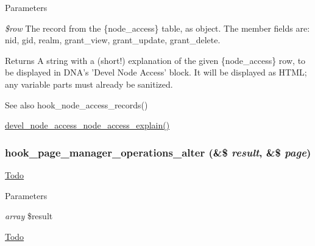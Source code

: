 \begin{DoxyParams}{Parameters}
\item[{\em \$row}]The record from the \{node\_\-access\} table, as object. The member fields are: nid, gid, realm, grant\_\-view, grant\_\-update, grant\_\-delete.\end{DoxyParams}
\begin{DoxyReturn}{Returns}
A string with a (short!) explanation of the given \{node\_\-access\} row, to be displayed in DNA's 'Devel Node Access' block. It will be displayed as HTML; any variable parts must already be sanitized.
\end{DoxyReturn}
\begin{DoxySeeAlso}{See also}
hook\_\-node\_\-access\_\-records() 

\hyperlink{devel__node__access_8module_a7b594d5b01b220abc354695853569809}{devel\_\-node\_\-access\_\-node\_\-access\_\-explain()} 
\end{DoxySeeAlso}
\hypertarget{group__hooks_gadade57abdccc892f62ed6bc7f089ca29}{
\subsubsection[{hook\_\-page\_\-manager\_\-operations\_\-alter}]{\setlength{\rightskip}{0pt plus 5cm}hook\_\-page\_\-manager\_\-operations\_\-alter (\&\$ {\em result}, \/  \&\$ {\em page})}}
\label{group__hooks_gadade57abdccc892f62ed6bc7f089ca29}
\begin{Desc}
\item[\hyperlink{todo__todo000009}{Todo}]\end{Desc}

\begin{DoxyParams}{Parameters}
\item[{\em array}]\$result \end{DoxyParams}
\begin{Desc}
\item[\hyperlink{todo__todo000010}{Todo}]\end{Desc}

